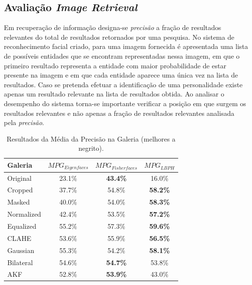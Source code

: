\documentclass{llncs}
\begin{document}
\subsection{Avaliação \textit{Image Retrieval}} \label{sec:avaliacao2}
Em recuperação de informação designa-se \textit{precisão} a fração de resultados relevantes do total de resultados retornados por uma pesquisa. No sistema de reconhecimento facial criado, para uma imagem fornecida é apresentada uma lista de possíveis entidades que se encontram representadas nessa imagem, em que o primeiro resultado representa a entidade com maior probabilidade de estar presente na imagem e em que cada entidade aparece uma única vez na lista de resultados. Caso se pretenda efetuar a identificação de uma personalidade existe apenas um resultado relevante na lista de resultados obtida. Ao analisar o desempenho do sistema torna-se importante verificar a posição em que surgem os resultados relevantes e não apenas a fração de resultados relevantes analisada pela \textit{precisão}.

\begin{table}[t]
	\centering
    \caption{Resultados da Média da Precisão na Galeria (melhores a negrito).}
    \begin{tabular}{l|ccc}
    Galeria    & $MPG_{Eigenfaces}$ & $MPG_{Fisherfaces}$ & $MPG_{LBPH}$ \\ 
    \hline\hline
    Original   & 23.1\%          & \textbf{43.4\%}  & 16.0\%             \\

    Cropped    & 37.7\%          & 54.8\%           & \textbf{58.2\%}    \\
    Masked     & 40.0\%          & 54.0\%           & \textbf{58.3\%}    \\

    Normalized & 42.4\%          & 53.5\%           & \textbf{57.2\%}    \\
    Equalized  & 55.2\%          & 57.3\%           & \textbf{59.6\%}    \\
    CLAHE      & 53.6\%          & 55.9\%           & \textbf{56.5\%}    \\

    Gaussian   & 55.3\%          & 54.2\%           & \textbf{58.1\%}    \\
    Bilateral  & 54.6\%          & \textbf{54.7\%}           & 53.8\%    \\
    AKF        & 52.8\%          & \textbf{53.9\%}           & 43.0\%             \\
    \hline\hline
    \end{tabular}
    \label{tab:resultadosprecicao}
\end{table}
\end{document}
